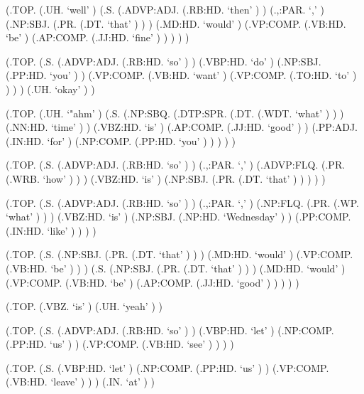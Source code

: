 \documentclass[10pt]{article}
\begin{document}
\begin{parsetree}  (.TOP. (.UH. `well' ) (.S. (.ADVP:ADJ. (.RB:HD. `then' ) ) (.,:PAR. `,' ) (.NP:SBJ. (.PR. (.DT. `that' ) ) ) (.MD:HD. `would' ) (.VP:COMP. (.VB:HD. `be' ) (.AP:COMP. (.JJ:HD. `fine' ) ) ) ) ) \end{parsetree}

\begin{parsetree}  (.TOP. (.S. (.ADVP:ADJ. (.RB:HD. `so' ) ) (.VBP:HD. `do' ) (.NP:SBJ. (.PP:HD. `you' ) ) (.VP:COMP. (.VB:HD. `want' ) (.VP:COMP. (.TO:HD. `to' ) ) ) ) (.UH. `okay' ) ) \end{parsetree}

\begin{parsetree}  (.TOP. (.UH. `"ahm' ) (.S. (.NP:SBQ. (.DTP:SPR. (.DT. (.WDT. `what' ) ) ) (.NN:HD. `time' ) ) (.VBZ:HD. `is' ) (.AP:COMP. (.JJ:HD. `good' ) ) (.PP:ADJ. (.IN:HD. `for' ) (.NP:COMP. (.PP:HD. `you' ) ) ) ) ) \end{parsetree}

\begin{parsetree}  (.TOP. (.S. (.ADVP:ADJ. (.RB:HD. `so' ) ) (.,:PAR. `,' ) (.ADVP:FLQ. (.PR. (.WRB. `how' ) ) ) (.VBZ:HD. `is' ) (.NP:SBJ. (.PR. (.DT. `that' ) ) ) ) ) \end{parsetree}

\begin{parsetree}  (.TOP. (.S. (.ADVP:ADJ. (.RB:HD. `so' ) ) (.,:PAR. `,' ) (.NP:FLQ. (.PR. (.WP. `what' ) ) ) (.VBZ:HD. `is' ) (.NP:SBJ. (.NP:HD. `Wednesday' ) ) (.PP:COMP. (.IN:HD. `like' ) ) ) ) \end{parsetree}

\begin{parsetree}  (.TOP. (.S. (.NP:SBJ. (.PR. (.DT. `that' ) ) ) (.MD:HD. `would' ) (.VP:COMP. (.VB:HD. `be' ) ) ) (.S. (.NP:SBJ. (.PR. (.DT. `that' ) ) ) (.MD:HD. `would' ) (.VP:COMP. (.VB:HD. `be' ) (.AP:COMP. (.JJ:HD. `good' ) ) ) ) ) \end{parsetree}

\begin{parsetree}  (.TOP. (.VBZ. `is' ) (.UH. `yeah' ) ) \end{parsetree}

\begin{parsetree}  (.TOP. (.S. (.ADVP:ADJ. (.RB:HD. `so' ) ) (.VBP:HD. `let' ) (.NP:COMP. (.PP:HD. `us' ) ) (.VP:COMP. (.VB:HD. `see' ) ) ) ) \end{parsetree}

\begin{parsetree}  (.TOP. (.S. (.VBP:HD. `let' ) (.NP:COMP. (.PP:HD. `us' ) ) (.VP:COMP. (.VB:HD. `leave' ) ) ) (.IN. `at' ) ) \end{parsetree}
\end{document}
